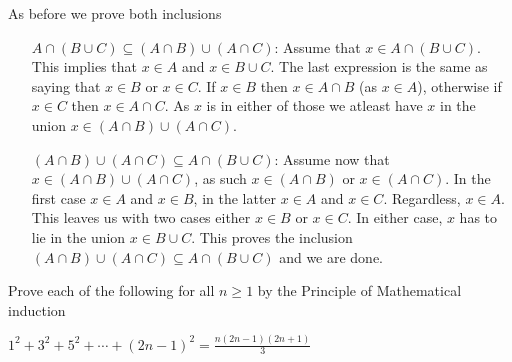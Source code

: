 \documentclass[a4paper, english, 12pt]{article} %
\newcommand{\solutions}{true} %
\begin{document}
\begin{answer}
  As before we prove both inclusions
  \begin{enumerate}[align=left]
    \item[$A \cap (B \cup C) \subseteq (A \cap B) \cup (A \cap C)$:] Assume that
      $x \in A \cap (B \cup C)$. This implies that $x \in A$ and $x \in B \cup
      C$. The last expression is the same as saying that $x \in B$ or $x \in C$.
      If $x \in B$ then $x \in A \cap B$ (as $x \in A$), otherwise if $x \in C$ then $x \in A
      \cap C$. As $x$ is in either of those we atleast have $x$ in the union $x
      \in (A \cap B) \cup (A \cap C)$.
    \item[$(A \cap B) \cup (A \cap C) \subseteq A \cap (B \cup C)$:]
      Assume now that $x \in (A \cap B) \cup (A \cap C)$, as such $x \in (A \cap
      B)$ or $x \in (A \cap C)$. In the first case $x \in A$ and $x \in B$, in
      the latter $x \in A$ and $x \in C$. Regardless, $x \in A$. This leaves us
      with two cases either $x \in B$ or $x \in C$. In either case, $x$ has to
      lie in the union $x \in B \cup C$. This proves the inclusion
      $(A \cap B) \cup (A \cap C) \subseteq A \cap (B \cup C)$ and we are
      done.  
  \end{enumerate} 
\end{answer}

\ifthenelse{\boolean{\solutions}}{\newpage}{}



\begin{problem}
  Prove each of the following for all $n \geq 1$ by the Principle of
  Mathematical induction
\end{problem}

\begin{subproblem}
  $\displaystyle 1^2 + 3^2 + 5^2 + \cdots + (2n-1)^2 = \frac{n(2n-1)(2n+1)}{3}$
\end{subproblem}
\end{document}
